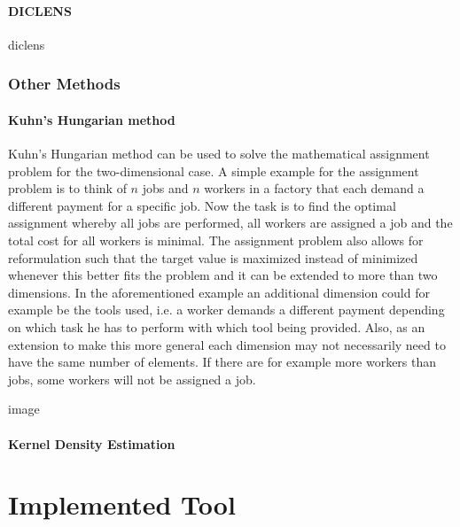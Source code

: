 \documentclass[
	a4paper,
	english,
	twoside,
	openright,               
	11pt                            
	]{report}
\begin{document}
\subsection{DICLENS}
diclens \cite{DICLENS}






\section{Other Methods}

\subsection{Kuhn’s Hungarian method}
Kuhn’s Hungarian method \cite{Kuhn2010} can be used to solve the mathematical assignment problem for the two-dimensional case. A simple example for the assignment problem is to think of $n$ jobs and $n$ workers in a factory that each demand a different payment for a specific job. Now the task is to find the optimal assignment whereby all jobs are performed, all workers are assigned a job and the total cost for all workers is minimal. The assignment problem also allows for reformulation such that the target value is maximized instead of minimized whenever this better fits the problem and it can be extended to more than two dimensions. In the aforementioned example an additional dimension could for example be the tools used, i.e. a worker demands a different payment depending on which task he has to perform with which tool being provided. Also, as an extension to make this more general each dimension may not necessarily need to have the same number of elements. If there are for example more workers than jobs, some workers will not be assigned a job.

image %

\subsection{Kernel Density Estimation}





\part{Implemented Tool}
\end{document}
